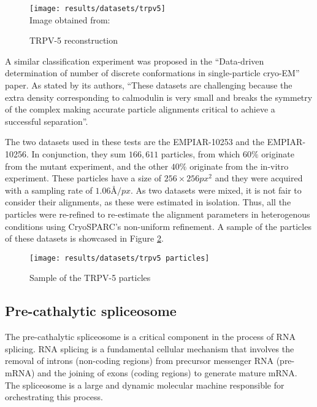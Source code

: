 \documentclass[../main.tex]{subfiles}
\begin{document}
\begin{figure}[htbp]
    \centering
    \texttt{[image: results/datasets/trpv5]}\\
    Image obtained from: \cite{dang2019}
    \caption{TRPV-5 reconstruction}
    \label{fig:5.1:trpv5}
\end{figure}

A similar classification experiment was proposed in the ``Data-driven determination of number of discrete conformations in single-particle cryo-EM'' paper. As stated by its authors, ``These datasets are challenging because the extra density corresponding to calmodulin is very small and breaks the symmetry of the complex making accurate particle alignments critical to achieve a successful separation''\cite{zhou2022}.

The two datasets used in these tests are the EMPIAR-10253\cite{empiar10253} and the EMPIAR-10256\cite{empiar10256}\cite{dang2019}. In conjunction, they sum $166,611$ particles, from which $60 \si{\percent}$ originate from the mutant experiment, and the other $40 \si{\percent}$ originate from the in-vitro experiment. These particles have a size of $256 \times 256 \si{px^2}$ and they were acquired with a sampling rate of $1.06 \si{\angstrom/px}$. As two datasets were mixed, it is not fair to consider their alignments, as these were estimated in isolation. Thus, all the particles were re-refined to re-estimate the alignment parameters in heterogenous conditions using CryoSPARC's non-uniform refinement\cite{cryosparc}. A sample of the particles of these datasets is showcased in Figure \ref{fig:5.1:trpv5_particles}.
 
\begin{figure}[htbp]
    \centering
    \texttt{[image: results/datasets/trpv5 particles]}
    \caption{Sample of the TRPV-5 particles}
    \label{fig:5.1:trpv5_particles}
\end{figure}

\subsection{Pre-cathalytic spliceosome}
The pre-cathalytic spliceosome is a critical component in the process of RNA splicing. RNA splicing is a fundamental cellular mechanism that involves the removal of introns (non-coding regions) from precursor messenger RNA (pre-mRNA) and the joining of exons (coding regions) to generate mature mRNA. The spliceosome is a large and dynamic molecular machine responsible for orchestrating this process.
\end{document}
